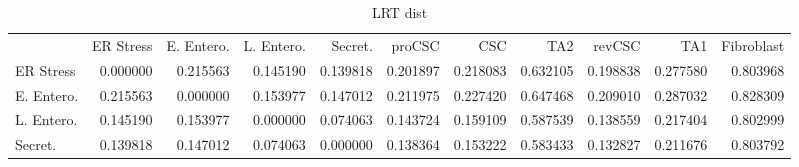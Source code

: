 \begin{table}
    \centering
    \caption{LRT dist}
    \label{tab:kgdistlrt}
    \begin{tabular}{lrrrrrrrrrr}
        {} & {ER Stress} & {E. Entero.} & {L. Entero.} & {Secret.} & {proCSC} & {CSC} & {TA2} & {revCSC} & {TA1} & {Fibroblast} \\
        ER Stress & {\cellcolor[HTML]{000004}} \color[HTML]{F1F1F1} 0.000000 & {\cellcolor[HTML]{490B6A}} \color[HTML]{F1F1F1} 0.215563 & {\cellcolor[HTML]{290B55}} \color[HTML]{F1F1F1} 0.145190 & {\cellcolor[HTML]{260C51}} \color[HTML]{F1F1F1} 0.139818 & {\cellcolor[HTML]{420A68}} \color[HTML]{F1F1F1} 0.201897 & {\cellcolor[HTML]{490B6A}} \color[HTML]{F1F1F1} 0.218083 & {\cellcolor[HTML]{E55C30}} \color[HTML]{F1F1F1} 0.632105 & {\cellcolor[HTML]{400A67}} \color[HTML]{F1F1F1} 0.198838 & {\cellcolor[HTML]{62146E}} \color[HTML]{F1F1F1} 0.277580 & {\cellcolor[HTML]{FCA60C}} \color[HTML]{000000} 0.803968 \\
        E. Entero. & {\cellcolor[HTML]{490B6A}} \color[HTML]{F1F1F1} 0.215563 & {\cellcolor[HTML]{000004}} \color[HTML]{F1F1F1} 0.000000 & {\cellcolor[HTML]{2D0B59}} \color[HTML]{F1F1F1} 0.153977 & {\cellcolor[HTML]{290B55}} \color[HTML]{F1F1F1} 0.147012 & {\cellcolor[HTML]{470B6A}} \color[HTML]{F1F1F1} 0.211975 & {\cellcolor[HTML]{4D0D6C}} \color[HTML]{F1F1F1} 0.227420 & {\cellcolor[HTML]{E9612B}} \color[HTML]{F1F1F1} 0.647468 & {\cellcolor[HTML]{450A69}} \color[HTML]{F1F1F1} 0.209010 & {\cellcolor[HTML]{65156E}} \color[HTML]{F1F1F1} 0.287032 & {\cellcolor[HTML]{FCB418}} \color[HTML]{000000} 0.828309 \\
        L. Entero. & {\cellcolor[HTML]{290B55}} \color[HTML]{F1F1F1} 0.145190 & {\cellcolor[HTML]{2D0B59}} \color[HTML]{F1F1F1} 0.153977 & {\cellcolor[HTML]{000004}} \color[HTML]{F1F1F1} 0.000000 & {\cellcolor[HTML]{0D0829}} \color[HTML]{F1F1F1} 0.074063 & {\cellcolor[HTML]{280B53}} \color[HTML]{F1F1F1} 0.143724 & {\cellcolor[HTML]{2F0A5B}} \color[HTML]{F1F1F1} 0.159109 & {\cellcolor[HTML]{D94D3D}} \color[HTML]{F1F1F1} 0.587539 & {\cellcolor[HTML]{260C51}} \color[HTML]{F1F1F1} 0.138559 & {\cellcolor[HTML]{490B6A}} \color[HTML]{F1F1F1} 0.217404 & {\cellcolor[HTML]{FCA60C}} \color[HTML]{000000} 0.802999 \\
        Secret. & {\cellcolor[HTML]{260C51}} \color[HTML]{F1F1F1} 0.139818 & {\cellcolor[HTML]{290B55}} \color[HTML]{F1F1F1} 0.147012 & {\cellcolor[HTML]{0D0829}} \color[HTML]{F1F1F1} 0.074063 & {\cellcolor[HTML]{000004}} \color[HTML]{F1F1F1} 0.000000 & {\cellcolor[HTML]{260C51}} \color[HTML]{F1F1F1} 0.138364 & {\cellcolor[HTML]{2D0B59}} \color[HTML]{F1F1F1} 0.153222 & {\cellcolor[HTML]{D84C3E}} \color[HTML]{F1F1F1} 0.583433 & {\cellcolor[HTML]{240C4F}} \color[HTML]{F1F1F1} 0.132827 & {\cellcolor[HTML]{470B6A}} \color[HTML]{F1F1F1} 0.211676 & {\cellcolor[HTML]{FCA60C}} \color[HTML]{000000} 0.803792 \\

\end{tabular}
\end{table}
